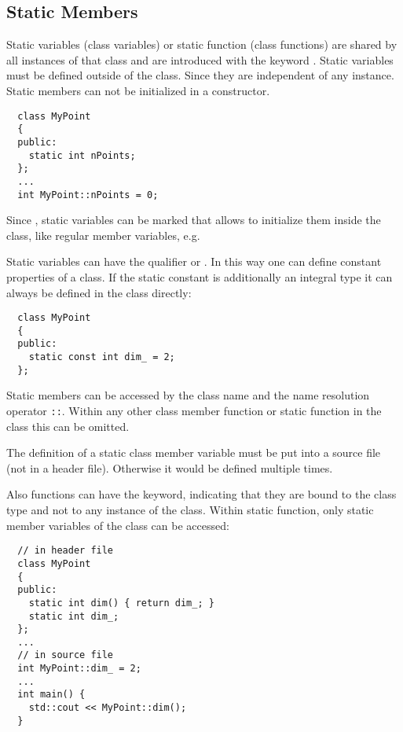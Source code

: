 \subsection{Static Members}
Static variables (class variables) or static function (class functions) are shared by all instances of that class and are introduced with the keyword .
Static variables must be defined outside of the class. Since they are independent of any instance. Static members can not be initialized in a constructor.
%
\begin{verbatim}
  class MyPoint
  {
  public:
    static int nPoints;
  };
  ...
  int MyPoint::nPoints = 0;
\end{verbatim}

Since \marginpar{[\cxx{17}]}, static variables can be marked  that allows to initialize them inside the class, like regular member
variables, e.g. 

Static variables can have the qualifier  or . In this way one can define constant properties of a class. If the static
constant is additionally an integral type it can always be defined in the class directly:
%
\begin{verbatim}
  class MyPoint
  {
  public:
    static const int dim_ = 2;
  };
\end{verbatim}

Static members can be accessed by the class name and the name resolution operator \texttt{::}. Within any other class member function or static function in the
class this can be omitted.

\begin{rem}
  The definition of a static class member variable must be put into a source file (not in a header file). Otherwise it would be defined multiple times.
\end{rem}

Also functions can have the  keyword, indicating that they are bound to the class type and not to any instance of the class. Within static
function, only static member variables of the class can be accessed:
%
\begin{verbatim}
  // in header file
  class MyPoint
  {
  public:
    static int dim() { return dim_; }
    static int dim_;
  };
  ...
  // in source file
  int MyPoint::dim_ = 2;
  ...
  int main() {
    std::cout << MyPoint::dim();
  }
\end{verbatim}

